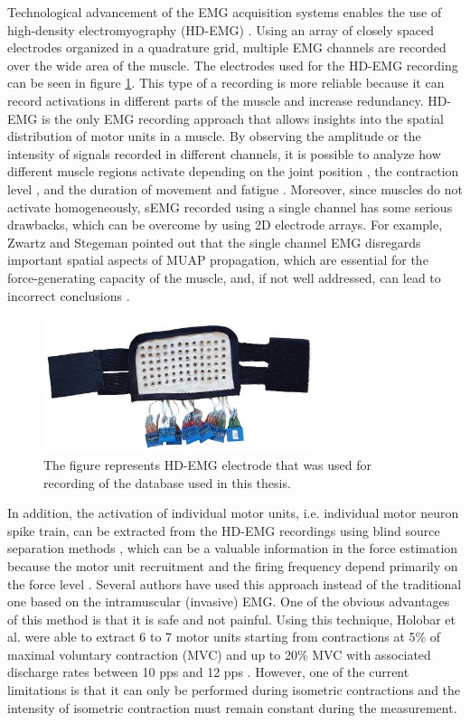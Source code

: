 Technological advancement of the EMG acquisition systems enables the use of high-density electromyography (HD-EMG) \citep{Zwarts2004}. Using an array of closely spaced electrodes organized in a quadrature grid, multiple EMG channels are recorded over the wide area of the muscle. The electrodes used for the HD-EMG recording can be seen in figure \ref{fig:electrode}. This type of a recording is more reliable because it can record activations in different parts of the muscle and increase redundancy. HD-EMG is the only EMG recording approach that allows insights into the spatial distribution of motor units in a muscle. By observing the amplitude or the intensity of signals recorded in different channels, it is possible to analyze how different muscle regions activate depending on the joint position \citep{Vieira2010}, the contraction level \citep{Holtermann2005}, and the duration of movement and fatigue \citep{Tucker2009, Staudenmann2014}. Moreover, since muscles do not activate homogeneously, sEMG recorded using a single channel has some serious drawbacks, which can be overcome by using 2D electrode arrays. For example, Zwartz and Stegeman pointed out that the single channel EMG disregards important spatial aspects of MUAP propagation, which are essential for the force-generating capacity of the muscle, and, if not well addressed, can lead to incorrect conclusions \citep{Zwarts2003}. 
\begin{figure}[ht]
\centering
\includegraphics[width=0.7\textwidth]{Images/introduction/electrode2.png}
\caption{The figure represents HD-EMG electrode that was used for recording of the database used in this thesis.}
\label{fig:electrode}
\end{figure}

In addition, the activation of individual motor units, i.e. individual motor neuron spike train, can be extracted from the HD-EMG recordings using blind source separation methods \citep{Holobar2007, Holobar2010}, which can be a valuable information in the force estimation because the motor unit recruitment and the firing frequency depend primarily on the force level \citep{Merletti-book}. Several authors have used this approach instead of the traditional one based on the intramuscular (invasive) EMG. One of the obvious advantages of this method is that it is safe and not painful. Using this technique, Holobar et al. were able to extract 6 to 7 motor units starting from contractions at 5\% of maximal voluntary contraction (MVC) and up to 20\% MVC with associated discharge rates between 10 pps and 12 pps \citep{Holobar2010}. However, one of the current limitations is that it can only be performed during isometric contractions and the intensity of isometric contraction must remain constant during the measurement.

